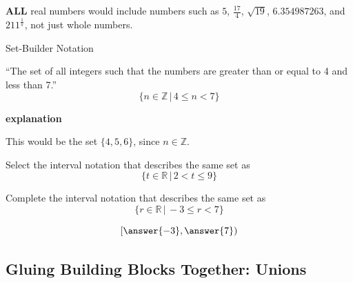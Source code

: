 \documentclass{ximera}
\begin{document}
\begin{warning}
\textbf{\textcolor{red!70!black}{ALL}} real numbers would include numbers such as $5$, $\frac{17}{4}$, $\sqrt{19}$, $6.354987263$, and $211^{\tfrac{1}{\pi}}$, not just whole numbers.
\end{warning}


\begin{example} Set-Builder Notation

``The set of all integers such that the numbers are greater than or equal to 4 and less than 7.''
\[ \{ n \in \mathbb {Z} \, | \, 4 \leq n < 7 \} \]

\textbf{\textcolor{red!75!green}{explanation}} 

This would be the set $\{ 4, 5, 6 \}$, since $n \in \mathbb{Z}$.


\end{example}




\begin{question} 


Select the interval notation that describes the same set as 
\[ \{ t \in \mathbb {R} \, | \, 2 < t \leq 9 \} \]
	\begin{multipleChoice}
	\choice {$[9, 2)$}
	\choice {$[2, 9)$}
	\choice [correct]{$(2, 9]$}
	\choice {$[2, 9]$}
	\end{multipleChoice}
\end{question}





\begin{question} 


Complete the interval notation that describes the same set as 
\[ \{ r \in \mathbb {R} \, | \, -3 \leq r < 7 \} \]

\[
\left [ \answer{-3} , \answer{7} \right )
\]



\end{question}




















\subsection*{Gluing Building Blocks Together: Unions}
\end{document}
